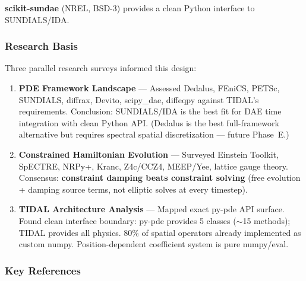 \textbf{scikit-sundae} (NREL, BSD-3) provides a clean Python interface to SUNDIALS/IDA.

\subsubsection{Research Basis}
\label{sec:migration-research}

Three parallel research surveys informed this design:

\begin{enumerate}
  \item \textbf{PDE Framework Landscape} --- Assessed Dedalus, FEniCS, PETSc, SUNDIALS,
    diffrax, Devito, scipy\_dae, diffeqpy against TIDAL's requirements.
    Conclusion: SUNDIALS/IDA is the best fit for DAE time integration with
    clean Python API. (Dedalus is the best full-framework alternative but
    requires spectral spatial discretization --- future Phase~E.)

  \item \textbf{Constrained Hamiltonian Evolution} --- Surveyed Einstein Toolkit, SpECTRE,
    NRPy+, Kranc, Z4c/CCZ4, MEEP/Yee, lattice gauge theory. Consensus:
    \textbf{constraint damping beats constraint solving} (free evolution + damping
    source terms, not elliptic solves at every timestep).

  \item \textbf{TIDAL Architecture Analysis} --- Mapped exact py-pde API surface. Found
    clean interface boundary: py-pde provides 5 classes ($\sim$15 methods); TIDAL
    provides all physics. 80\% of spatial operators already implemented as
    custom numpy. Position-dependent coefficient system is pure numpy/eval.
\end{enumerate}

\subsubsection{Key References}
\label{sec:migration-references}

